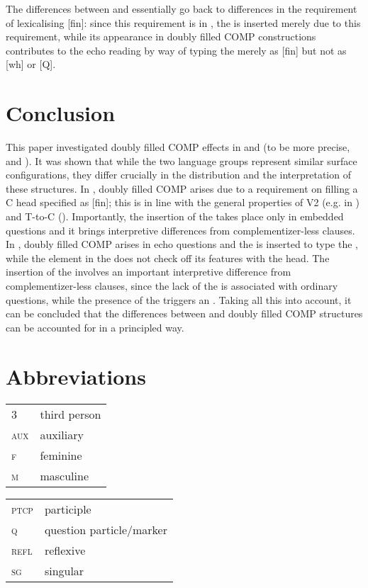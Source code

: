 \documentclass[output=paper,modfonts, hidelinks, newtxmath]{langscibook}
\begin{document}
The differences between  and  essentially go back to differences in the requirement of lexicalising [fin]: since this requirement is  in , the  is inserted merely due to this requirement, while its appearance in  doubly filled COMP constructions contributes to the echo reading by way of typing the  merely as [fin] but not as [wh] or [Q].

\section{Conclusion}
This paper investigated doubly filled COMP effects in  and  (to be more precise,  and ). It was shown that while the two language groups represent similar surface configurations, they differ crucially in the distribution and the interpretation of these structures. In , doubly filled COMP arises due to a requirement on filling a C head specified as [fin]; this is in line with the general properties of V2 (e.g. in ) and T-to-C (). Importantly, the insertion of the  takes place only in embedded questions and it brings interpretive differences from complementizer-less clauses. In , doubly filled COMP arises in echo questions and the  is inserted to type the , while the element in the  does not check off its features with the head. The insertion of the  involves an important interpretive difference from complementizer-less clauses, since the lack of the  is associated with ordinary questions, while the presence of the  triggers an . Taking all this into account, it can be concluded that the differences between  and  doubly filled COMP structures can be accounted for in a principled way.

\section*{Abbreviations}

\begin{tabularx}{.5\textwidth}{@{}lQ@{}}
3&third person\\
\textsc{aux}&auxiliary\\
\textsc{f}&{feminine}\\
\textsc{m}&{masculine}\\
\end{tabularx}%
\begin{tabularx}{.5\textwidth}{@{}lQ@{}}
\textsc{ptcp}&{participle}\\
\textsc{q}&question particle/marker\\
\textsc{refl}&reflexive\\
\textsc{sg}&singular\\
\end{tabularx}
\end{document}
